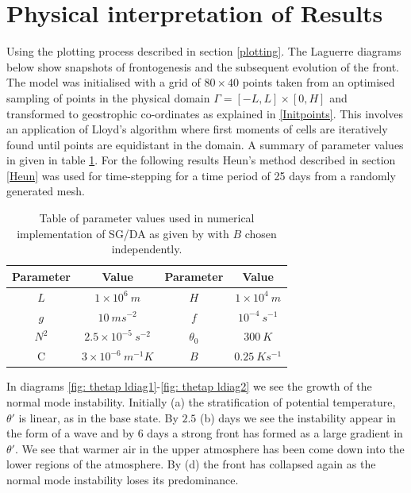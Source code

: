 \section{Physical interpretation of Results \label{laguerre plots}}
Using the plotting process described in section \ref{plotting}. The Laguerre diagrams below show snapshots of frontogenesis and the subsequent evolution of the front. The model was initialised with a grid of $80 \times 40$ points taken from an optimised sampling of points in the physical domain $\Gamma = [-L,L]\times[0,H]$ and transformed to geostrophic co-ordinates as explained in \ref{Initpoints}. This involves an application of Lloyd's algorithm where first moments of cells are iteratively found until points are equidistant in the domain. A summary of parameter values in given in table \ref{param vals}.  For the following results Heun's method described in section \ref{Heun} was used for time-stepping for a time period of 25 days from a randomly generated mesh.
\\
\linebreak
\begin{table}
	\begin{tabular}{|c|c|c|c|}
		\hline 
		Parameter & Value & Parameter & Value \\
		\hline 
		$L$ & $1 \times 10^6 \ m$ & $H$ & $1 \times 10^4 \ m$ \\ 
		\hline 
		$g$ & $10 \ ms^{-2}$ &	$f$ & $10^{-4} \ s^{-1}$ \\ 
		\hline 
		$N^2$ & $2.5 \times10^{-5} \ s^{-2}$&$\theta_0$ & $300 \ K$ \\ 
		\hline 
		C & $3 \times 10^{-6} \ m^{-1}K$ & $B$ & $0.25 \ Ks^{-1}$ \\ 
		\hline 
	\end{tabular}
	\caption[Table of parameter values used in numerical implementation of SG/DA]{Table of parameter values used in numerical implementation of SG/DA as given by \cite{Cullen2006a} with $B$ chosen independently.}
	\label{param vals}
\end{table}
In diagrams \ref{fig: thetap ldiag1}-\ref{fig: thetap ldiag2} we see the growth of the normal mode instability. Initially (a) the stratification of potential temperature, $\theta '$ is linear, as in the base state. By $2.5$ (b) days we see the instability appear in the form of a wave and by $6$ days a strong front has formed as a large gradient in $\theta '$. We see that warmer air in the upper atmosphere has been come down into the lower regions of the atmosphere. By (d) the front has collapsed again as the normal mode instability loses its predominance. 
